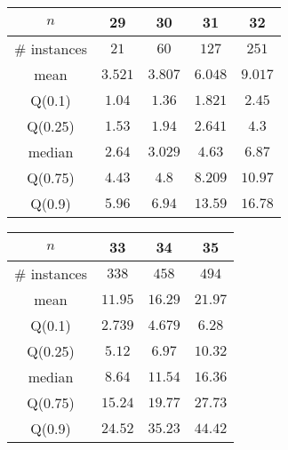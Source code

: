 \begin{tabular}{c|cccc} 
\hline 
$n$ & 29 & 30 & 31 & 32 \tabularnewline 
\hline 
\hline 
\# instances & $21$ & $60$ & $127$ & $251$ \tabularnewline 
mean & $3.521$ & $3.807$ & $6.048$ & $9.017$ \tabularnewline 
Q(0.1) & $1.04$ & $1.36$ & $1.821$ & $2.45$ \tabularnewline 
Q(0.25) & $1.53$ & $1.94$ & $2.641$ & $4.3$ \tabularnewline 
median & $2.64$ & $3.029$ & $4.63$ & $6.87$ \tabularnewline 
Q(0.75) & $4.43$ & $4.8$ & $8.209$ & $10.97$ \tabularnewline 
Q(0.9) & $5.96$ & $6.94$ & $13.59$ & $16.78$ \tabularnewline 
\hline 
\end{tabular} 
\medskip{} 

\begin{tabular}{c|ccc} 
\hline 
$n$ & 33 & 34 & 35 \tabularnewline 
\hline 
\hline 
\# instances & $338$ & $458$ & $494$ \tabularnewline 
mean & $11.95$ & $16.29$ & $21.97$ \tabularnewline 
Q(0.1) & $2.739$ & $4.679$ & $6.28$ \tabularnewline 
Q(0.25) & $5.12$ & $6.97$ & $10.32$ \tabularnewline 
median & $8.64$ & $11.54$ & $16.36$ \tabularnewline 
Q(0.75) & $15.24$ & $19.77$ & $27.73$ \tabularnewline 
Q(0.9) & $24.52$ & $35.23$ & $44.42$ \tabularnewline 
\hline 
\end{tabular} 
\medskip{} 

